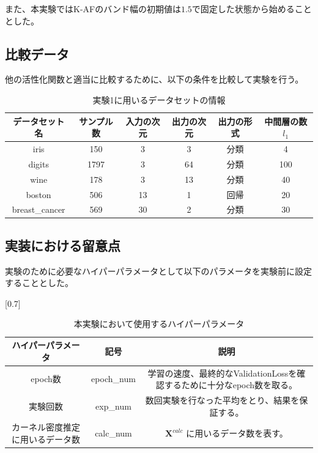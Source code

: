 また、本実験ではK-AFのバンド幅の初期値は$ 1.5 $で固定した状態から始めることとした。

\subsection{比較データ}

他の活性化関数と適当に比較するために、以下の条件を比較して実験を行う。


\begin{table}[htbp]
    \begin{center}
        \caption{実験1に用いるデータセットの情報}
        \label{dataset_name}
        \vspace{2mm} 
        \begin{tabular}{ |c|c|c|c|c|c| }
        データセット名 & サンプル数 & 入力の次元 & 出力の次元 & 出力の形式 & 中間層の数 $ {l_1} $ \\
        \hline
        iris           & 150    & 3         & 3        & 分類      & 4 \\
        digits         & 1797   & 3         & 64       & 分類      & 100 \\
        wine           & 178    & 3         & 13       & 分類      & 40 \\
        boston         & 506    & 13        & 1        & 回帰      & 20 \\
        breast\_cancer & 569    & 30        & 2        & 分類      & 30 \\
        \end{tabular}
    \end{center}
\end{table}


\subsection{実装における留意点}
実験のために必要なハイパーパラメータとして以下のパラメータを実験前に設定することとした。

\begin{table}[htbp]
    \begin{center}
        \caption{本実験において使用するハイパーパラメータ}
        \vspace{2mm} 
        \scalebox{0.7}[0.7]{
            \begin{tabular}{||c | c |c||}
            ハイパーパラメータ & 記号 & 説明 \\
            \hline
            epoch数                           & epoch\_num      & 学習の速度、最終的なValidationLossを確認するために十分なepoch数を取る。  \\
            実験回数                           & exp\_num     & 数回実験を行なった平均をとり、結果を保証する。 \\
            カーネル密度推定に用いるデータ数        & calc\_num           & $ \mathbf{X}^{calc} $ に用いるデータ数を表す。  \\
            \end{tabular}
        }
    \end{center}
\end{table}


